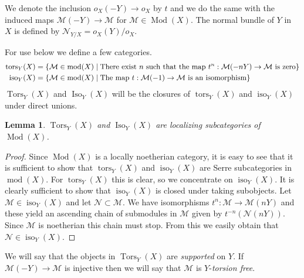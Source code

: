 \documentclass{amsproc}
\def\Mscr{{\mathcal M}}
\def\Nscr{{\mathcal N}}
\def\iso{\operatorname{iso}}
\def\tors{\operatorname{tors}}
\def\Iso{\operatorname{Iso}}
\def\Tors{\operatorname{Tors}}
\def\coh{\operatorname {mod}}
\def\tors{\operatorname {tors}}
\def\Tors{\operatorname {Tors}}
\def\Qch{\operatorname {Mod}}
\def\r{\rightarrow}
\let\oldtext\text
\def\text#1{\oldtext{\upshape #1}}
\newtheorem{lemmas}{Lemma}[subsection]
\theoremstyle{definition}
\theoremstyle{remark}
\numberwithin{equation}{section}
\numberwithin{table}{section}
\numberwithin{figure}{section}
\begin{document}
We denote the inclusion $o_X(-Y)\r o_X$ by $t$ and we do the same
with the induced maps $\Mscr(-Y)\r \Mscr$ for $\Mscr\in \Qch(X)$.  The
normal bundle of $Y$ in $X$ is defined by $\Nscr_{Y/X}=o_X(Y)/o_X$. 

 For use below we define a few categories.
\begin{align*}
\tors_Y(X)&=\{\Mscr\in\coh(X)\mid \text{There exist $n$ such that the
   map $t^n:\Mscr(-nY)\r \Mscr$ is zero}\}\\
\iso_Y(X)&=\{\Mscr\in \coh(X)\mid \text{The  map $t:\Mscr(-1)\r
  \Mscr$ is an isomorphism}\}
\end{align*}
$\Tors_Y(X)$ and $\Iso_Y(X)$ will be the closures of $\tors_Y(X)$ and
$\iso_Y(X)$ under direct unions.
\begin{lemmas}
$\Tors_Y(X)$ and $\Iso_Y(X)$ are localizing subcategories of
$\Qch(X)$.
\end{lemmas}
\begin{proof} Since $\Qch(X)$ is a locally noetherian category, it is
  easy to see that it is sufficient to  show that $\tors_Y(X)$ and
  $\iso_Y(X)$ are Serre subcategories in $\coh(X)$. For $\tors_Y(X)$
  this is clear, so we concentrate on $\iso_Y(X)$. It is clearly
  sufficient to show that $\iso_Y(X)$ is closed under taking
  subobjects. Let $\Mscr\in \iso_Y(X)$ and let $\Nscr\subset\Mscr$. We
  have isomorphisms $t^n:\Mscr\r \Mscr(nY)$ and these yield
 an ascending chain of submodules in $\Mscr$ given by
  $t^{-n}(\Nscr(nY))$. Since $\Mscr$ is noetherian this chain must stop.
  From this we easily obtain that $\Nscr\in\iso_Y(X)$.
\end{proof}
We will say that the objects in $\Tors_Y(X)$ are \emph{supported} on
$Y$. If $\Mscr(-Y)\r\Mscr$ is injective then we will say that $\Mscr$
is $Y$-\emph{torsion free}.
\end{document}
